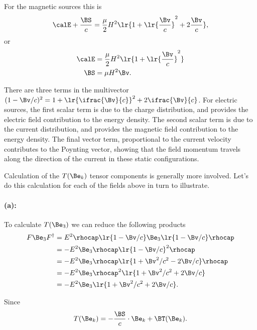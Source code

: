 For the magnetic sources this is
\begin{equation}\label{eqn:poyntingStaticExamples:920}
\calE + \frac{\BS}{c} = \frac{\mu}{2} H^2 \lr{ 1 + \lr{ \frac{\Bv}{c} }^2 + 2 \frac{\Bv}{c} },
\end{equation}
or
\begin{equation}\label{eqn:poyntingStaticExamples:940}
\begin{aligned}
\calE &= \frac{\mu}{2} H^2 \lr{ 1 + \lr{ \frac{\Bv}{c} }^2 } \\
\BS &= \mu H^2 \Bv.
\end{aligned}
\end{equation}

There are three terms in the multivector \( (1 -\Bv/c)^2 = 1 + \lr{ \ifrac{\Bv}{c} }^2 + 2 \ifrac{\Bv}{c} \).  For electric sources,
the first scalar term is due to the charge distribution, and provides the electric field contribution to the energy density.
The second scalar term is due to the current distribution, and provides the magnetic field contribution to the energy density.
The final vector term, proportional to the current velocity contributes to the Poynting vector, showing that the field momentum travels along the direction of the current in these static configurations.

Calculation of the \( T(\Be_k) \) tensor components is generally more involved.
Let's do this calculation for each of the fields above in turn to illustrate.

\paragraph{(a):}
To calculate \( T(\Be_3) \) we can reduce the following products
\begin{equation}\label{eqn:poyntingStaticExamples:960}
\begin{aligned}
F \Be_3 F^\dagger
&= E^2 \rhocap \lr{ 1 - \Bv/c} \Be_3 \lr{1 - \Bv/c} \rhocap \\
&= -E^2 \Be_3 \rhocap \lr{1 - \Bv/c}^2 \rhocap \\
&= -E^2 \Be_3 \rhocap \lr{1 + \Bv^2/c^2 - 2 \Bv/c} \rhocap \\
&= -E^2 \Be_3 \rhocap^2 \lr{1 + \Bv^2/c^2 + 2 \Bv/c} \\
&= -E^2 \Be_3 \lr{1 + \Bv^2/c^2 + 2 \Bv/c}.
\end{aligned}
\end{equation}

Since
\begin{equation}\label{eqn:poyntingStaticExamples:980}
T(\Be_k) = - \frac{\BS}{c} \cdot \Be_k + \BT(\Be_k).
\end{equation}

